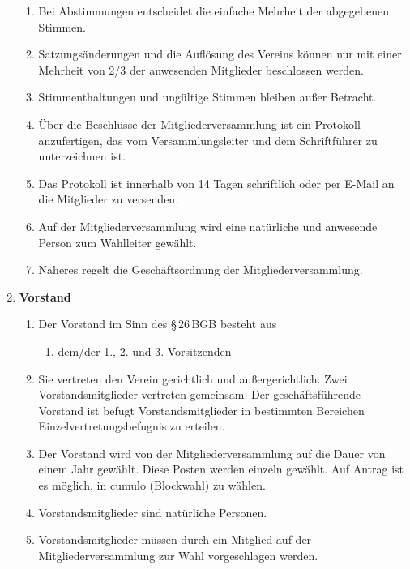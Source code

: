 \documentclass[german]{article}
\newcommand{\paragr}[1]{\item \textsf{\textbf{#1}}}
\begin{document}
\begin{enumerate}
\begin{enumerate}
\item Bei Abstimmungen entscheidet die einfache Mehrheit der abgegebenen Stimmen.

\item Satzungsänderungen und die Auflösung des Vereins können nur mit einer Mehrheit von 2/3 der anwesenden Mitglieder beschlossen werden.

\item Stimmenthaltungen und ungültige Stimmen bleiben außer Betracht.

\item Über die Beschlüsse der Mitgliederversammlung ist ein Protokoll anzufertigen, das vom Versammlungsleiter und dem Schriftführer zu unterzeichnen ist.

\item Das Protokoll ist innerhalb von 14 Tagen schriftlich oder per E-Mail an die Mitglieder zu versenden.

\item Auf der Mitgliederversammlung wird eine natürliche und anwesende Person zum Wahlleiter gewählt.

\item Näheres regelt die Geschäftsordnung der Mitgliederversammlung.

\end{enumerate}


\paragr{Vorstand}
\begin{enumerate}

\item Der Vorstand im Sinn des §\,26\,BGB besteht aus
\begin{enumerate}
\item dem/der 1., 2. und 3. Vorsitzenden
\end{enumerate}

\item Sie vertreten den Verein gerichtlich und außergerichtlich.
Zwei Vorstandsmitglieder vertreten gemeinsam. Der geschäftsführende Vorstand ist befugt Vorstandsmitglieder in bestimmten Bereichen Einzelvertretungsbefugnis zu erteilen.

\item Der Vorstand wird von der Mitgliederversammlung auf die Dauer von einem Jahr gewählt. 
Diese Posten werden einzeln gewählt. Auf Antrag ist es möglich, in cumulo (Blockwahl) zu wählen.

\item Vorstandsmitglieder sind natürliche Personen.

\item Vorstandsmitglieder müssen durch ein Mitglied auf der Mitgliederversammlung zur Wahl vorgeschlagen werden.


\end{enumerate}
\end{enumerate}
\end{document}

